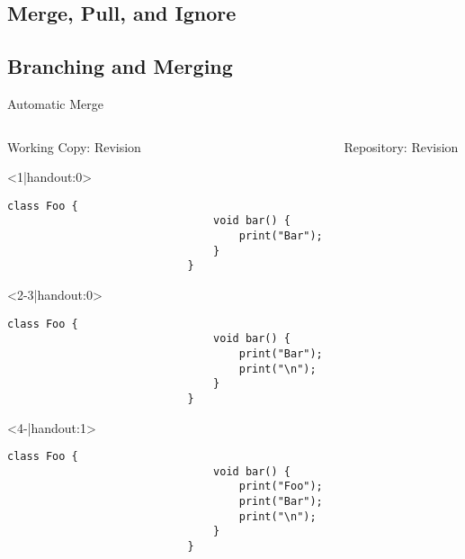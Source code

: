 \subsection{Merge, Pull, and Ignore}
\slideMergePull

\slideIgnore

\subsection{Branching and Merging}
\begin{frame}{\insertsubsection}
	\slideBranchingAndMerging
\end{frame}

\begin{frame}[fragile]{Automatic Merge}
	\begin{columns}[onlytextwidth]
		\begin{column}{0.6\linewidth}
			\begin{columns}[T]
				\begin{column}{0.5\linewidth}
					Working Copy: Revision \only<4>{\emph{11$^*$}}\\[2mm]
					
					\begin{onlyenv}<1|handout:0>
						\begin{lstlisting}[style=java,basicstyle=\fontfamily{pcr}\small\selectfont,numbers=none,escapechar=|]
							class Foo {
								void bar() {
									print("Bar");
								}
							}	
						\end{lstlisting}
					\end{onlyenv}
					\begin{onlyenv}
						\begin{lstlisting}[style=java,basicstyle=\fontfamily{pcr}\small\selectfont,numbers=none,escapechar=|]
							class Foo {
								void bar() {
									print("Bar");
									print("\n");
								}
							}	
						\end{lstlisting}
					\end{onlyenv}
					\begin{onlyenv}
						\begin{lstlisting}[style=java,basicstyle=\fontfamily{pcr}\small\selectfont,numbers=none,escapechar=|]
							class Foo {
								void bar() {
									print("Foo");
									print("Bar");
									print("\n");
								}
							}	
						\end{lstlisting}
					\end{onlyenv}
				\end{column}
				\begin{column}{0.5\linewidth}					
					Repository: Revision \only<3->{\emph{11}}
					

\end{column}
\end{columns}
\end{column}
\end{columns}
\end{frame}
